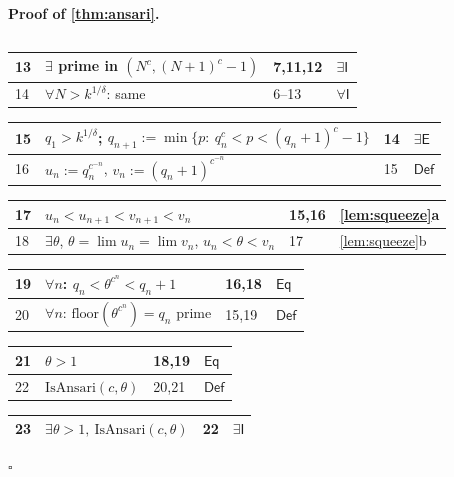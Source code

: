 \documentclass[11pt,reqno]{amsart}
\theoremstyle{blueplain}
\renewcommand{\qedsymbol}{\textcolor{proofqed}{\ensuremath{\square}}}
\renewenvironment{proof}[1][Proof]{\par\noindent\textbf{\textcolor{proofhead}{#1.}}\par\nobreak}{\par\nobreak\hfill\qedsymbol}
\numberwithin{equation}{section}
\begin{document}
\begin{proof}[\textbf{Proof of \cref{thm:ansari}}]
{\begin{tabular}{|m{0.7cm}|m{12cm}|m{1.4cm}|m{2.5cm}|}
\end{tabular}%
\noindent \newline
\noindent
\begin{tabular}{|m{0.7cm}|m{12cm}|m{1.4cm}|m{2.5cm}|}
\hline
13 & $\exists$ prime in $(N^{c},(N+1)^{c}-1)$ & 7,11,12 & $\exists\mathsf{I}$ \\ \hline
14 & $\forall N>k^{1/\delta}$: same & 6--13 & $\forall\mathsf{I}$ \\
\end{tabular}%
\noindent \newline
\noindent
\begin{tabular}{|m{0.7cm}|m{12cm}|m{1.4cm}|m{2.5cm}|}
\hline
15 & $q_1>k^{1/\delta}$; $q_{n+1}:=\min\{p:\ q_n^{c}<p<(q_n+1)^{c}-1\}$ & 14 & $\exists\mathsf{E}$ \\ \hline
16 & $u_n:=q_n^{c^{-n}}$, $v_n:=(q_n+1)^{c^{-n}}$ & 15 & $\mathsf{Def}$ \\
\end{tabular}%
\noindent \newline
\noindent
\begin{tabular}{|m{0.7cm}|m{12cm}|m{1.4cm}|m{2.5cm}|}
\hline
17 & $u_n<u_{n+1}<v_{n+1}<v_n$ & 15,16 & \cref{lem:squeeze}a \\ \hline
18 & $\exists\theta$, $\theta=\lim u_n=\lim v_n$, $u_n<\theta<v_n$ & 17 & \cref{lem:squeeze}b \\
\end{tabular}%
\noindent \newline
\noindent
\begin{tabular}{|m{0.7cm}|m{12cm}|m{1.4cm}|m{2.5cm}|}
\hline
19 & $\forall n$: $q_n<\theta^{c^{n}}<q_n+1$ & 16,18 & $\mathsf{Eq}$ \\ \hline
20 & $\forall n$: $\mathrm{floor}(\theta^{c^{n}})=q_n$ prime & 15,19 & $\mathsf{Def}$ \\
\end{tabular}%
\noindent \newline
\noindent
\begin{tabular}{|m{0.7cm}|m{12cm}|m{1.4cm}|m{2.5cm}|}
\hline
21 & $\theta>1$ & 18,19 & $\mathsf{Eq}$ \\ \hline
22 & $\mathrm{IsAnsari}(c,\theta)$ & 20,21 & $\mathsf{Def}$ \\
\end{tabular}%
\noindent \newline
\noindent
\begin{tabular}{|m{0.7cm}|m{12cm}|m{1.4cm}|m{2.5cm}|}
\hline
23 & $\exists\theta>1,\ \mathrm{IsAnsari}(c,\theta)$ & 22 & $\exists\mathsf{I}$ \\ \hline

\end{tabular}}
\end{proof}
\end{document}
